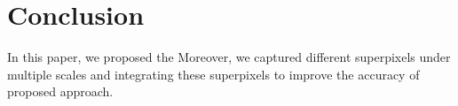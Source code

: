 \documentclass[journal]{IEEEtran}
\begin{document}





\section{Conclusion}
In this paper, we proposed the 
Moreover, we captured different superpixels under multiple scales and
integrating these superpixels to improve the accuracy of proposed approach.
\end{document}
